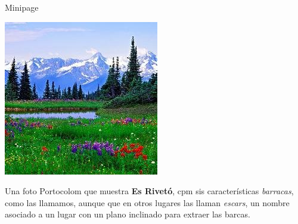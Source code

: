 \documentclass{beamer}
\begin{document}
\begin{frame}{Minipage}
\begin{minipage}[l]{0.45\textwidth}
\includegraphics[width=\textwidth]{paisaje}
\end{minipage}
\begin{minipage}[r]{0.5\textwidth}
Una foto Portocolom que muestra {\bf Es Rivetó}, cpm sis características {\em barracas}, como las llamamos, aunque que en otros lugares las llaman {\em escars}, un nombre asociado a un lugar con un plano inclinado para extraer las barcas.
\end{minipage}
\end{frame}
\end{document}
